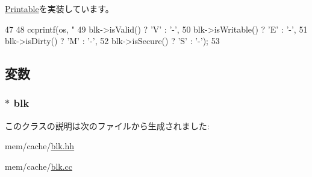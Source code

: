 \hyperlink{classPrintable_a3be2c5a60e9670becc3259fc689833c5}{Printable}を実装しています。


\begin{DoxyCode}
47 {
48     ccprintf(os, "%
49              blk->isValid()    ? 'V' : '-',
50              blk->isWritable() ? 'E' : '-',
51              blk->isDirty()    ? 'M' : '-',
52              blk->isSecure()   ? 'S' : '-');
53 }
\end{DoxyCode}


\subsection{変数}
\hypertarget{classCacheBlkPrintWrapper_a73fc018cafd4a76a537fa7841ff7b406}{
\subsubsection[{blk}]{$\ast$ {\bf blk}}}
\label{classCacheBlkPrintWrapper_a73fc018cafd4a76a537fa7841ff7b406}


このクラスの説明は次のファイルから生成されました:\begin{DoxyCompactItemize}
\item 
mem/cache/\hyperlink{blk_8hh}{blk.hh}\item 
mem/cache/\hyperlink{blk_8cc}{blk.cc}\end{DoxyCompactItemize}
